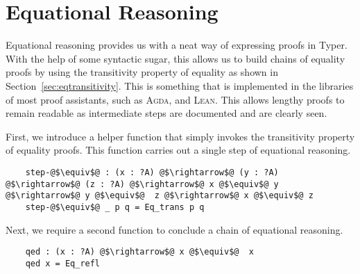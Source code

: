 \documentclass[12pt,twoside,maitrise]{dms}
\theoremstyle{definition}
\numberwithin{equation}{section}
\numberwithin{table}{chapter}
\numberwithin{figure}{chapter}
\def\Agda{\textsc{Agda}\xspace}
\def\Lean{\textsc{Lean}\xspace}
\begin{document}




\def\bibname{References}






\anglais
\appendix

\chapter{Equational Reasoning}\label{section:eqreasoning}
Equational reasoning provides us with a neat way of expressing proofs in Typer.
With the help of some syntactic sugar, this allows us to build chains of
equality proofs by using the transitivity property of equality as shown in
Section~\ref{sec:eqtransitivity}. This is something that is implemented
in the libraries of most proof assistants, such as \Agda{}, and \Lean{}. This
allows lengthy proofs to remain readable as intermediate steps are documented
and are clearly seen.

First, we introduce a helper function that simply invokes the transitivity
property of equality proofs. This function carries out a single step of
equational reasoning.

\begin{verbatim}
    step-@$\equiv$@ : (x : ?A) @$\rightarrow$@ (y : ?A) @$\rightarrow$@ (z : ?A) @$\rightarrow$@ x @$\equiv$@ y @$\rightarrow$@ y @$\equiv$@  z @$\rightarrow$@ x @$\equiv$@ z
    step-@$\equiv$@ _ p q = Eq_trans p q
\end{verbatim}

Next, we require a second function to conclude a chain of equational reasoning.

\begin{verbatim}
    qed : (x : ?A) @$\rightarrow$@ x @$\equiv$@  x
    qed x = Eq_refl
\end{verbatim}
\end{document}
